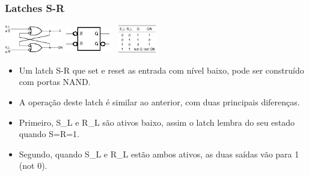 \documentclass{beamer}
\begin{document}
\begin{frame}
  \frametitle{Latches S-R}
 \begin{center}
  \includegraphics[height = 0.5in, width = 1in]{slide18_filomeno} 
  \includegraphics[height = 0.5in, width = 0.8in]{slide18_filomeno2} 
  \includegraphics[height = 0.5in, width = 0.8in]{slide18_filomeno3} 
 \end{center}
 \begin{itemize}
  \item Um latch S-R que set e reset as entrada com nível baixo, pode ser construído com portas NAND.\pause
  \item A operação deste latch é similar ao anterior, com duas principais diferenças.\pause
  \item Primeiro, S\_L e R\_L são ativos baixo, assim o latch lembra do seu estado quando S=R=1.\pause
  \item Segundo, quando S\_L e R\_L estão ambos ativos, as duas saídas vão para 1 (not 0).
 \end{itemize}
\end{frame}
\end{document}

